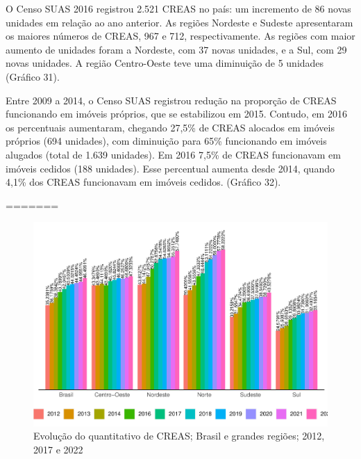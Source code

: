 \documentclass[
  brazilian]{report}
\begin{document}
O Censo SUAS 2016 registrou 2.521 CREAS no país: um incremento de 86
novas unidades em relação ao ano anterior. As regiões Nordeste e Sudeste
apresentaram os maiores números de CREAS, 967 e 712, respectivamente. As
regiões com maior aumento de unidades foram a Nordeste, com 37 novas
unidades, e a Sul, com 29 novas unidades. A região Centro-Oeste teve uma
diminuição de 5 unidades (Gráfico 31).

Entre 2009 a 2014, o Censo SUAS registrou redução na proporção de CREAS
funcionando em imóveis próprios, que se estabilizou em 2015. Contudo, em
2016 os percentuais aumentaram, chegando 27,5\% de CREAS alocados em
imóveis próprios (694 unidades), com diminuição para 65\% funcionando em
imóveis alugados (total de 1.639 unidades). Em 2016 7,5\% de CREAS
funcionavam em imóveis cedidos (188 unidades). Esse percentual aumenta
desde 2014, quando 4,1\% dos CREAS funcionavam em imóveis cedidos.
(Gráfico 32).

=======

\begin{figure}
\includegraphics{Censo-SUAS-2022_files/figure-latex/creas-qtd_munic-1} \caption[Evolução do quantitativo de CREAS]{Evolução do quantitativo de CREAS; Brasil e grandes regiões; 2012, 2017 e 2022}\label{fig:creas-qtd_munic}
\end{figure}
\end{document}
